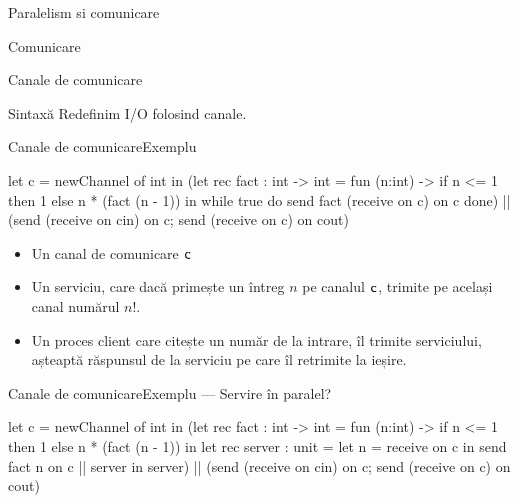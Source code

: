 \documentclass[xcolor=pdftex,romanian,colorlinks]{beamer}
\begin{document}
\begin{section}{Paralelism si comunicare}
\begin{subsection}{Comunicare}
\begin{frame}{Canale de comunicare}
\begin{block}{Sintaxă}
Redefinim I/O folosind canale.
\begin{syntaxBlock}{\Exp}
\vspace{-5ex}
\alert{
\begin{itemize}
\item[]\renewcommand{\syntaxKeyword}{}
\syntax{\ldots}{}
\syntaxCont{\SnewChannel \Tip }{}
\syntaxCont{\Ssend \Exp \Son \Exp}{}
\syntaxCont{\Sreceive \Exp}{}
\syntaxCont{{\Scin} \Smid {\Scout}}{}
\item[]
\syntax[\Tip]{\ldots \Smid \Tip \Schannel}{}
\end{itemize}
}
\end{syntaxBlock}
\end{block}
\end{frame}


\begin{frame}[fragile]{Canale de comunicare}{Exemplu}
\begin{asciiml}
let c = newChannel of int in
   (let rec fact : int -> int = 
           fun (n:int) -> if n <= 1 then 1 else n * (fact (n - 1)) in
    while true do 
       send fact (receive on c) on c
    done)
   ||
   (send (receive on cin) on c;
    send (receive on c) on cout)
\end{asciiml}
\begin{itemize}
\item Un canal de comunicare $\mathrel{\text{\ttfamily c}}$
\item Un serviciu, care dacă primește un întreg $n$ pe canalul $\mathrel{\text{\ttfamily c}}$, trimite pe același canal numărul $n!$.
\item Un proces client care citește un număr de la intrare, îl trimite serviciului, așteaptă răspunsul de la serviciu pe care îl retrimite la ieșire. 
\end{itemize}
\end{frame}

\begin{frame}[fragile]{Canale de comunicare}{Exemplu — Servire în paralel?}
\begin{asciiml}
let c = newChannel of int in
   (let rec fact : int -> int = 
           fun (n:int) -> if n <= 1 then 1 else n * (fact (n - 1)) in
    let rec server : unit = 
      let n = receive on c in
         send fact n on c || server
    in server)
   ||
   (send (receive on cin) on c;
    send (receive on c) on cout)
\end{asciiml}


\end{frame}
\end{subsection}
\end{section}
\end{document}
